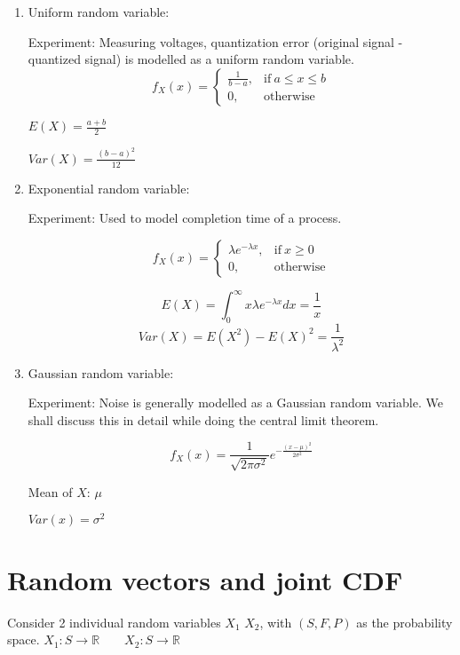 \documentclass{article}
\begin{document}
\begin{enumerate}
    \item Uniform random variable:

    Experiment: Measuring voltages, quantization error (original signal - quantized signal) is modelled as a uniform random variable.
    \begin{equation*}
            f_X (x)=
            \begin{cases}
            \frac{1}{b-a}, & \text{if}\ a \leq x \leq b \\
             0, & \text{otherwise}
            \end{cases}
       \end{equation*}

    $E(X)= \frac{a+b}{2}$

    $ Var(X)= \frac{(b-a)^2}{12}$
    \item Exponential random variable:

    Experiment: Used to model completion time of a process.

    \begin{equation*}
            f_X (x)=
            \begin{cases}
            \lambda e^{-\lambda x}, & \text{if}\ x \geq 0\\
             0, & \text{otherwise}
            \end{cases}
       \end{equation*}


       $$E(X)=\int_{0}^{\infty} x \lambda e^{-\lambda x}dx = \frac{1}{x}$$
       $$ Var(X)= E(X^2)- E(X)^2=\frac{1}{\lambda ^2}$$

       \item Gaussian random variable:

       Experiment: Noise is generally modelled as a Gaussian random variable. We shall discuss this in detail while doing the central limit theorem.

       $$ f_X(x)= \frac{1}{\sqrt{2\pi \sigma^2}} e^{-\frac{(x- \mu)^2}{2 \sigma^2}}$$

       Mean of $X$: $\mu$

       $Var(x)= {\sigma}^2$
   \end{enumerate}


\section{Random vectors and joint CDF}
Consider 2 individual random variables $X_1$ $X_2$, with $(S,F,P)$ as the probability space.
$X_1:S \to \mathbb{R} \qquad X_2:S \to \mathbb{R}$
\end{document}
